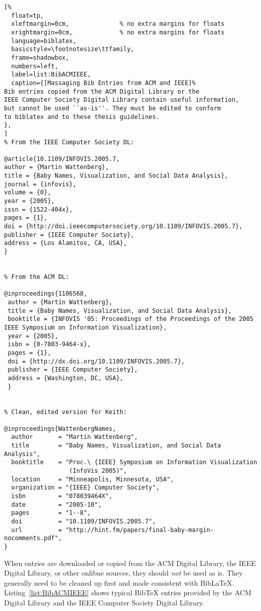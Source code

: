 \begin{samepage}
\begin{lstlisting}[%
  float=tp,
  xleftmargin=0cm,              % no extra margins for floats
  xrightmargin=0cm,             % no extra margins for floats
  language=biblatex,
  basicstyle=\footnotesize\ttfamily,
  frame=shadowbox,
  numbers=left,
  label=list:BibACMIEEE,
  caption={[Massaging Bib Entries from ACM and IEEE]%
Bib entries copied from the ACM Digital Library or the
IEEE Computer Society Digital Library contain useful information,
but cannot be used ``as-is''. They must be edited to conform
to biblatex and to these thesis guidelines.
},
]
% From the IEEE Computer Society DL:

@article{10.1109/INFOVIS.2005.7,
author = {Martin Wattenberg},
title = {Baby Names, Visualization, and Social Data Analysis},
journal = {infovis},
volume = {0},
year = {2005},
issn = {1522-404x},
pages = {1},
doi = {http://doi.ieeecomputersociety.org/10.1109/INFOVIS.2005.7},
publisher = {IEEE Computer Society},
address = {Los Alamitos, CA, USA},
}


% From the ACM DL:

@inproceedings{1106568,
 author = {Martin Wattenberg},
 title = {Baby Names, Visualization, and Social Data Analysis},
 booktitle = {INFOVIS '05: Proceedings of the Proceedings of the 2005 IEEE Symposium on Information Visualization},
 year = {2005},
 isbn = {0-7803-9464-x},
 pages = {1},
 doi = {http://dx.doi.org/10.1109/INFOVIS.2005.7},
 publisher = {IEEE Computer Society},
 address = {Washington, DC, USA},
 }


% Clean, edited version for Keith:

@inproceedings{WattenbergNames,
  author       = "Martin Wattenberg",
  title        = "Baby Names, Visualization, and Social Data Analysis",
  booktitle    = "Proc.\ {IEEE} Symposium on Information Visualization
                  (InfoVis 2005)",
  location     = "Minneapolis, Minnesota, USA",
  organization = "{IEEE} Computer Society",
  isbn         = "078039464X",
  date         = "2005-10",
  pages        = "1--8",
  doi          = "10.1109/INFOVIS.2005.7",
  url          = "http://hint.fm/papers/final-baby-margin-nocomments.pdf",
}
\end{lstlisting}
\end{samepage}



When  entries are downloaded or copied from the ACM
Digital Library, the IEEE Digital Library, or other onlibne sources,
they should \emph{not} be used as is. They generally need to be
cleaned up first and made consistent with BibLaTeX.
Listing~\ref{list:BibACMIEEE} shows typical BibTeX entries provided by
the ACM Digital Library and the IEEE Computer Society Digital Library.


